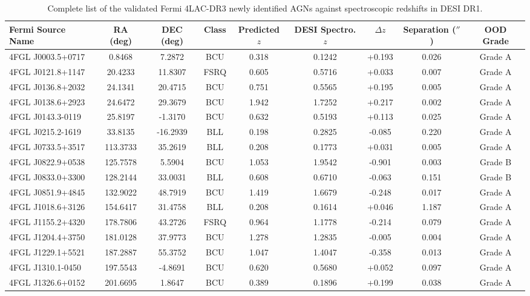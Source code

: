 \begin{table}[t]
\centering
\caption{Complete list of the validated Fermi 4LAC-DR3 newly identified AGNs against spectroscopic redshifts in DESI DR1.}
\label{tab:external_validation_sources}
\begin{tabular}{lcccccccc}
\hline\hline
\textbf{Fermi Source Name} & \textbf{RA (deg)} & \textbf{DEC (deg)} & \textbf{Class} & \textbf{Predicted $z$} & \textbf{DESI Spectro. $z$} & \textbf{$\Delta z$} & \textbf{Separation ($''$)} & \textbf{OOD Grade} \\
\hline
4FGL J0003.5+0717 & 0.8468 & 7.2872 & BCU & 0.318 & 0.1242 & +0.193 & 0.026 & Grade A \\
4FGL J0121.8+1147 & 20.4233 & 11.8307 & FSRQ & 0.605 & 0.5716 & +0.033 & 0.007 & Grade A \\
4FGL J0136.8+2032 & 24.1341 & 20.4715 & BCU & 0.751 & 0.5565 & +0.195 & 0.005 & Grade A \\
4FGL J0138.6+2923 & 24.6472 & 29.3679 & BCU & 1.942 & 1.7252 & +0.217 & 0.002 & Grade A \\
4FGL J0143.3-0119 & 25.8197 & -1.3170 & BCU & 0.632 & 0.5193 & +0.113 & 0.025 & Grade A \\
4FGL J0215.2-1619 & 33.8135 & -16.2939 & BLL & 0.198 & 0.2825 & -0.085 & 0.220 & Grade A \\
4FGL J0733.5+3517 & 113.3733 & 35.2619 & BLL & 0.208 & 0.1773 & +0.031 & 0.005 & Grade A \\
4FGL J0822.9+0538 & 125.7578 & 5.5904 & BCU & 1.053 & 1.9542 & -0.901 & 0.003 & Grade B \\
4FGL J0833.0+3300 & 128.2144 & 33.0031 & BLL & 0.608 & 0.6710 & -0.063 & 0.151 & Grade B \\
4FGL J0851.9+4845 & 132.9022 & 48.7919 & BCU & 1.419 & 1.6679 & -0.248 & 0.017 & Grade A \\
4FGL J1018.6+3126 & 154.6417 & 31.4758 & BLL & 0.208 & 0.1614 & +0.046 & 1.187 & Grade A \\
4FGL J1155.2+4320 & 178.7806 & 43.2726 & FSRQ & 0.964 & 1.1778 & -0.214 & 0.079 & Grade A \\
4FGL J1204.4+3750 & 181.0128 & 37.9773 & BCU & 1.278 & 1.2835 & -0.005 & 0.004 & Grade A \\
4FGL J1229.1+5521 & 187.2887 & 55.3752 & BCU & 1.047 & 1.4047 & -0.358 & 0.013 & Grade A \\
4FGL J1310.1-0450 & 197.5543 & -4.8691 & BCU & 0.620 & 0.5680 & +0.052 & 0.097 & Grade A \\
4FGL J1326.6+0152 & 201.6695 & 1.8647 & BCU & 0.389 & 0.1896 & +0.199 & 0.038 & Grade A \\

\end{tabular}
\end{table}
